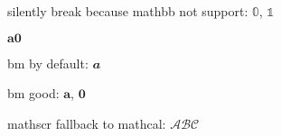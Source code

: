 \documentclass{article}
\begin{document}
silently break because mathbb not support: $𝟘$, $𝟙$

$𝐚 𝟎$

bm by default: $𝒂$

\renewcommand \umiMathbf {\bm}
bm good: $𝐚$, $𝟎$

mathscr fallback to mathcal: $𝒜ℬ𝒞$
\end{document}
